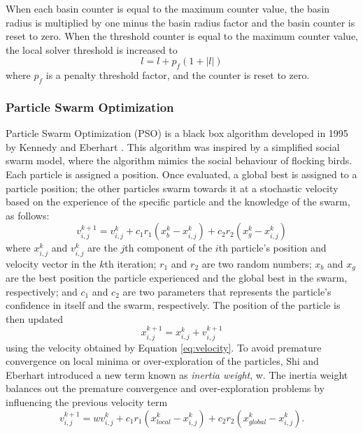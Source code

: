 When each basin counter is equal to the maximum counter value, the basin radius is multiplied by one minus the basin radius factor and the basin counter is reset to zero. When the threshold counter is equal to the maximum counter value, the local solver threshold is increased to
\begin{equation}
    l = l + p_f(1+|l|)
\end{equation}
where $p_f$ is a penalty threshold factor, and the counter is reset to zero.

\subsubsection{Particle Swarm Optimization}
Particle Swarm Optimization (PSO) is a black box algorithm developed in 1995 by Kennedy and Eberhart \cite{Kennedy1995}. This algorithm was inspired by a simplified social swarm model, where the algorithm mimics the social behaviour of flocking birds. Each particle is assigned a position. Once evaluated, a global best is assigned to a particle position; the other particles swarm towards it at a stochastic velocity based on the experience of the specific particle and the knowledge of the swarm, as follows: 
\begin{equation}
    \label{eq:velocity}
    v^{k+1}_{i,j} = v^{k}_{i,j} + c_1r_1(x^{k}_b - x^{k}_{i,j}) + c_2r_2(x^{k}_g - x^{k}_{i,j})
\end{equation}
where $x^k_{i,j}$ and $v^k_{i,j}$ are the $j$th component of the $i$th particle's position and velocity vector in the $k$th iteration; $r_1$ and $r_2$ are two random numbers; $x_b$ and $x_g$ are the best position the particle experienced and the global best in the swarm, respectively; and $c_1$ and $c_2$ are two parameters that represents the particle's confidence in itself and the swarm, respectively. The position of the particle is then updated
\begin{equation}
    \label{eq:position}
    x^{k+1}_{i,j} = x^k_{i,j} + v^{k+1}_{i,j}
\end{equation}
using the velocity obtained by Equation \ref{eq:velocity}. To avoid premature convergence on local minima or over-exploration of the particles, Shi and Eberhart \cite{Eberhart2000} introduced a new term known as \textit{inertia weight}, w. The inertia weight balances out the premature convergence and over-exploration problems by influencing the previous velocity term
\begin{equation}
    \label{eq:velocity2}
    v^{k+1}_{i,j} = wv^{k}_{i,j} + c_1r_1(x^{k}_{local} - x^{k}_{i,j}) + c_2r_2(x^{k}_{global} - x^{k}_{i,j}).
\end{equation}

